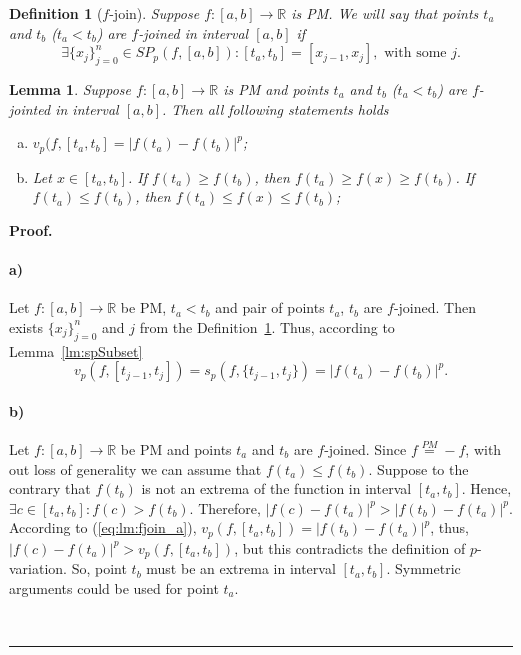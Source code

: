 \documentclass[12pt, a4paper]{article}
\newtheorem{lemma}[theorem]{Lemma}
\newtheorem{definition}[theorem]{Definition}
\newenvironment{proof}[1][Proof]{\noindent \textbf{#1.} }{\  \rule{0.5em}{0.5em}}
\numberwithin{equation}{section}
\begin{document}
\begin{definition}[$f$-join]\label{def:fjoin}
  Suppose $f:[a,b] \rightarrow \mathbb{R}$ is PM.
  We will say that points $t_a$ and $t_b$ ($t_a<t_b$) 
  are \emph{$f$-joined} in interval $[a,b]$ if 
  \begin{equation}
    \exists \{x_j\}_{j=0}^{n} \in SP_{p}(f,[a,b]):
      [t_a,t_b]=[x_{j-1},x_j], \text{ with some } j.
  \end{equation}  
\end{definition}

\begin{lemma}\label{lm:fjoin} 
  Suppose $f:[a,b] \rightarrow \mathbb{R}$ is PM and 
  points $t_a$ and $t_b$ ($t_a<t_b$) are 
  $f$-jointed in interval $[a,b]$.
  Then all following statements holds   
  \begin{enumerate}[a)]
    \item \label{lm:fjoin_a} 
    $v_p(f, [t_a,t_b] = \left|f(t_a)-f(t_b)\right|^p$;
    
    \item \label{lm:fjoin_b} 
    Let $x \in [t_a, t_b]$. 
    If $f(t_a) \geq f(t_b)$, then $f(t_a) \geq f(x) \geq f(t_b)$.
    If $f(t_a) \leq f(t_b)$, then $f(t_a) \leq f(x) \leq f(t_b)$;
    
  \end{enumerate}
\end{lemma}
\begin{proof}
  \paragraph*{a)}
  Let $f:[a,b] \rightarrow \mathbb{R}$  be PM, 
  $t_a<t_b$ and pair of points $t_a$, $t_b$ are $f$-joined. 
  Then exists $\{x_j\}_{j=0}^{n}$ and $j$ from the
  Definition~\ref{def:fjoin}.
  Thus, according to Lemma~\ref{lm:spSubset}
  \begin{equation}\label{eq:lm:fjoin_a}
    v_p(f,[t_{j-1}, t_j]) = 
      s_p\left(f,\{t_{j-1}, t_j\}\right) = \left|f(t_a)-f(t_b)\right|^p.
  \end{equation}      
  
  \paragraph*{b)}
  Let $f:[a,b] \rightarrow \mathbb{R}$ be PM 
  and points $t_a$ and $t_b$ are $f$-joined.
  Since $f \stackrel{PM}{=} -f$, with out loss of 
  generality we can assume that
  $f(t_a) \leq f(t_b)$.  
  Suppose to the contrary that $f(t_b)$ 
  is not an extrema of the function in interval $[t_a,t_b]$.
  Hence, $\exists c \in [t_a, t_b]: f(c)>f(t_b)$. Therefore,
  $|f(c)-f(t_a)|^p>|f(t_b)-f(t_a)|^p$.
  According to (\ref{eq:lm:fjoin_a}), 
  $v_p(f,[t_a,t_b])=|f(t_b)-f(t_a)|^p$, 
  thus, $|f(c)-f(t_a)|^p>v_p(f,[t_a,t_b])$,
  but this contradicts the definition of $p$-variation.  
  So, point $t_b$ must be an extrema in interval $[t_a,t_b]$.
  Symmetric arguments could be used for point $t_a$.  
  
  
\end{proof}
\end{document}
